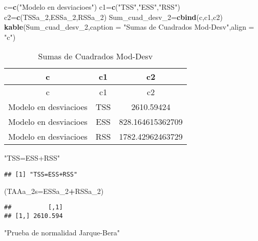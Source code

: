 \documentclass[
]{article}
\newenvironment{Shaded}{\begin{snugshade}}{\end{snugshade}}
\newcommand{\DataTypeTok}[1]{\textcolor[rgb]{0.13,0.29,0.53}{#1}}
\newcommand{\DecValTok}[1]{\textcolor[rgb]{0.00,0.00,0.81}{#1}}
\newcommand{\KeywordTok}[1]{\textcolor[rgb]{0.13,0.29,0.53}{\textbf{#1}}}
\newcommand{\NormalTok}[1]{#1}
\newcommand{\OperatorTok}[1]{\textcolor[rgb]{0.81,0.36,0.00}{\textbf{#1}}}
\newcommand{\StringTok}[1]{\textcolor[rgb]{0.31,0.60,0.02}{#1}}
\begin{document}
\begin{Shaded}
\begin{Highlighting}[]
\NormalTok{c=}\KeywordTok{c}\NormalTok{(}\StringTok{"Modelo en desviacioes"}\NormalTok{)}
\NormalTok{c1=}\KeywordTok{c}\NormalTok{(}\StringTok{"TSS"}\NormalTok{,}\StringTok{"ESS"}\NormalTok{,}\StringTok{"RSS"}\NormalTok{)}
\NormalTok{c2=}\KeywordTok{c}\NormalTok{(TSSa_}\DecValTok{2}\NormalTok{,ESSa_}\DecValTok{2}\NormalTok{,RSSa_}\DecValTok{2}\NormalTok{)}
\NormalTok{Sum_cuad_desv_}\DecValTok{2}\NormalTok{=}\KeywordTok{cbind}\NormalTok{(c,c1,c2)}
\KeywordTok{kable}\NormalTok{(Sum_cuad_desv_}\DecValTok{2}\NormalTok{,}\DataTypeTok{caption =} \StringTok{"Sumas de Cuadrados Mod-Desv"}\NormalTok{,}\DataTypeTok{align =} \StringTok{"c"}\NormalTok{)}
\end{Highlighting}
\end{Shaded}

\begin{longtable}[]{@{}ccc@{}}
\caption{Sumas de Cuadrados Mod-Desv}\tabularnewline
\toprule
c & c1 & c2\tabularnewline
\midrule
\endfirsthead
\toprule
c & c1 & c2\tabularnewline
\midrule
\endhead
Modelo en desviacioes & TSS & 2610.59424\tabularnewline
Modelo en desviacioes & ESS & 828.164615362709\tabularnewline
Modelo en desviacioes & RSS & 1782.42962463729\tabularnewline
\bottomrule
\end{longtable}

\begin{Shaded}
\begin{Highlighting}[]
\StringTok{"TSS=ESS+RSS"}
\end{Highlighting}
\end{Shaded}

\begin{verbatim}
## [1] "TSS=ESS+RSS"
\end{verbatim}

\begin{Shaded}
\begin{Highlighting}[]
\NormalTok{(}\DataTypeTok{TAAa_2s=}\NormalTok{ESSa_}\DecValTok{2}\OperatorTok{+}\NormalTok{RSSa_}\DecValTok{2}\NormalTok{)}
\end{Highlighting}
\end{Shaded}

\begin{verbatim}
##          [,1]
## [1,] 2610.594
\end{verbatim}

\begin{Shaded}
\begin{Highlighting}[]
\StringTok{"Prueba de normalidad Jarque-Bera"}
\end{Highlighting}
\end{Shaded}
\end{document}
